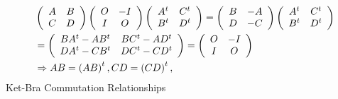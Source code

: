 \documentclass[aps,preprint]{revtex4}%
\begin{document}
\begin{align}
&  \left(
\begin{array}
[c]{cc}%
A & B\\
C & D
\end{array}
\right)  \left(
\begin{array}
[c]{cc}%
O & -I\\
I & O
\end{array}
\right)  \left(
\begin{array}
[c]{cc}%
A^{t} & C^{t}\\
B^{t} & D^{t}%
\end{array}
\right)  =\left(
\begin{array}
[c]{cc}%
B & -A\\
D & -C
\end{array}
\right)  \left(
\begin{array}
[c]{cc}%
A^{t} & C^{t}\\
B^{t} & D^{t}%
\end{array}
\right) \\
&  =\left(
\begin{array}
[c]{cc}%
BA^{t}-AB^{t} & BC^{t}-AD^{t}\\
DA^{t}-CB^{t} & DC^{t}-CD^{t}%
\end{array}
\right)  =\left(
\begin{array}
[c]{cc}%
O & -I\\
I & O
\end{array}
\right) \\
&  \Rightarrow AB=\left(  AB\right)  ^{t},CD=\left(  CD\right)  ^{t},
\end{align}
Ket-Bra Commutation Relationships%
\end{document}
